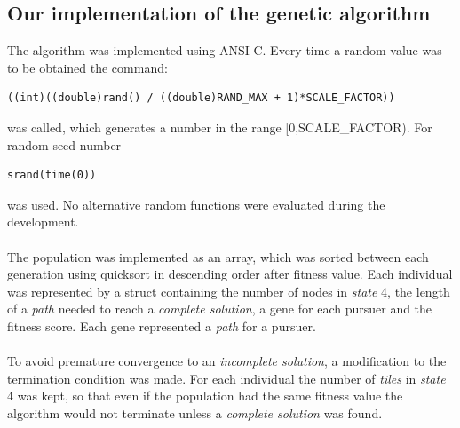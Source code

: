 \subsection{Our implementation of the genetic algorithm}
The algorithm was implemented using ANSI C. Every time a random value was to be obtained the command:
\begin{verbatim}
((int)((double)rand() / ((double)RAND_MAX + 1)*SCALE_FACTOR))
\end{verbatim}
was called, which generates a number in the range [0,SCALE\_FACTOR). For random seed number
\begin{verbatim}
srand(time(0))
\end{verbatim}
was used. No alternative random functions were evaluated during the development.\\\\
The population was implemented as an array, which was sorted between each generation using quicksort\cite{quicksort} in descending order after fitness value. Each individual was represented by a struct containing the number of nodes in \emph{state} 4, the length of a \emph{path} needed to reach a \emph{complete solution}, a gene for each pursuer and the fitness score. Each gene represented a \emph{path} for a pursuer.\\\\
%
To avoid premature convergence to an \emph{incomplete solution}, a modification to the termination condition was made. For each individual the number of \emph{tiles} in \emph{state} 4 was kept, so that even if the population had the same fitness value the algorithm would not terminate unless a \emph{complete solution} was found.
\newpage